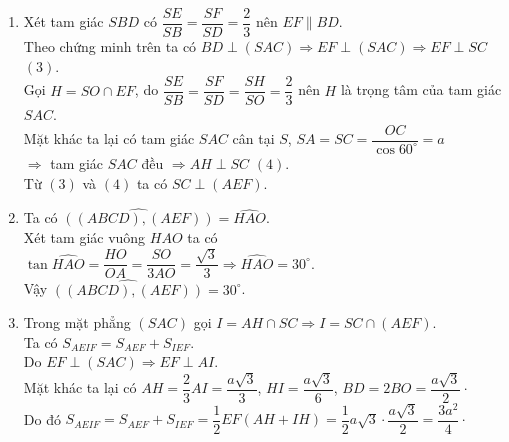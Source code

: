 \begin{bt}
{\begin{enumerate}
					Theo giả thiết $ABCD$ là hình thoi tâm $O$, cạnh $a$, $\widehat{ABC} = 60^\circ$ nên $ABC$ là tam giác đều cạnh $a$.\\
					$\Rightarrow OA = OC = \dfrac{a}{2}\cdot$\\
					Mặt khác $SO \perp (ABCD)$ nên $\widehat{\left(SC, (ABCD)\right)} = \widehat{SCO} = 60^\circ$.\\
					Xét tam giác $SOC$ có $SO = OC\cdot\tan 60^\circ = \dfrac{a\sqrt{3}}{2}\cdot$
			\item Xét tam giác $SBD$ có $\dfrac{SE}{SB} = \dfrac{SF}{SD} = \dfrac{2}{3}$ nên $EF \parallel BD$.\\
					Theo chứng minh trên ta có $BD \perp (SAC) \Rightarrow EF \perp (SAC) \Rightarrow EF \perp SC$ \hfill $(3)$.\\
					Gọi $H = SO \cap EF$, do $\dfrac{SE}{SB} = \dfrac{SF}{SD} = \dfrac{SH}{SO} = \dfrac{2}{3}$ nên $H$ là trọng tâm của tam giác $SAC$.\\
					Mặt khác ta lại có tam giác $SAC$ cân tại $S$, $SA = SC = \dfrac{OC}{\cos 60^\circ} = a$\\
					$\Rightarrow$ tam giác $SAC$ đều $\Rightarrow AH \perp SC$ \hfill $(4)$.\\
					Từ $(3)$ và $(4)$ ta có $SC \perp (AEF)$.
			\item Ta có $\widehat{\left((ABCD), (AEF)\right)} = \widehat{HAO}$.\\
					Xét tam giác vuông $HAO$ ta có $\tan\widehat{HAO} = \dfrac{HO}{OA} = \dfrac{SO}{3AO} = \dfrac{\sqrt{3}}{3} \Rightarrow \widehat{HAO} = 30^\circ$.\\
					Vậy $\widehat{\left((ABCD), (AEF)\right)} =  30^\circ$.
			\item Trong mặt phẳng $(SAC)$ gọi $I = AH \cap SC \Rightarrow I = SC \cap (AEF)$.\\
					Ta có $S_{AEIF} = S_{AEF} + S_{IEF}$.\\
					Do $EF \perp (SAC) \Rightarrow EF \perp AI$.\\
					Mặt khác ta lại có $AH = \dfrac{2}{3}AI = \dfrac{a\sqrt{3}}{3}$, $HI = \dfrac{a\sqrt{3}}{6}$, $BD = 2BO = \dfrac{a\sqrt{3}}{2}\cdot$\\
					Do đó $S_{AEIF} = S_{AEF} + S_{IEF} = \dfrac{1}{2}EF(AH + IH) = \dfrac{1}{2}a\sqrt{3}\cdot\dfrac{a\sqrt{3}}{2} = \dfrac{3a^2}{4}\cdot$
		\end{enumerate}
	}
\end{bt}

